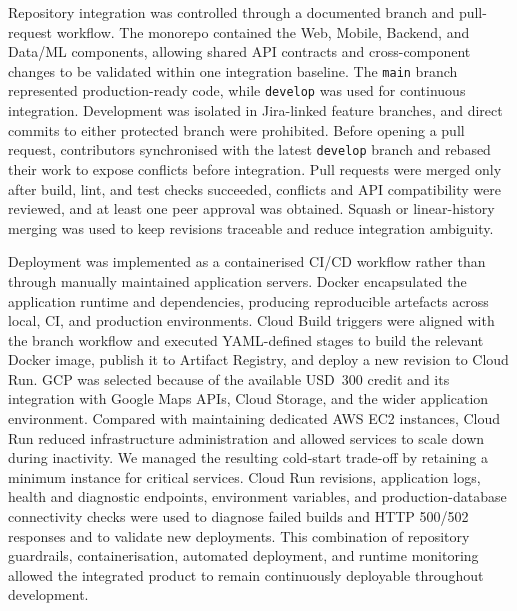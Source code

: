﻿\documentclass[conference,a4paper]{IEEEtran}
\begin{document}
Repository integration was controlled through a documented branch and
pull-request workflow. The monorepo contained the Web, Mobile, Backend, and
Data/ML components, allowing shared API contracts and cross-component
changes to be validated within one integration baseline. The
\texttt{main} branch represented production-ready code, while
\texttt{develop} was used for continuous integration. Development was
isolated in Jira-linked feature branches, and direct commits to either
protected branch were prohibited. Before opening a pull request,
contributors synchronised with the latest \texttt{develop} branch and
rebased their work to expose conflicts before integration. Pull requests
were merged only after build, lint, and test checks succeeded, conflicts
and API compatibility were reviewed, and at least one peer approval was
obtained. Squash or linear-history merging was used to keep revisions
traceable and reduce integration ambiguity.

Deployment was implemented as a containerised CI/CD workflow rather than
through manually maintained application servers. Docker encapsulated the
application runtime and dependencies, producing reproducible artefacts
across local, CI, and production environments. Cloud Build triggers were
aligned with the branch workflow and executed YAML-defined stages to build
the relevant Docker image, publish it to Artifact Registry, and deploy a
new revision to Cloud Run. GCP was selected because of the available
USD~300 credit and its integration with Google Maps APIs, Cloud Storage,
and the wider application environment. Compared with maintaining dedicated
AWS EC2 instances, Cloud Run reduced infrastructure administration and
allowed services to scale down during inactivity. We managed the resulting
cold-start trade-off by retaining a minimum instance for critical services.
Cloud Run revisions, application logs, health and diagnostic endpoints,
environment variables, and production-database connectivity checks were
used to diagnose failed builds and HTTP 500/502 responses and to validate
new deployments. This combination of repository guardrails,
containerisation, automated deployment, and runtime monitoring allowed the
integrated product to remain continuously deployable throughout
development.
\end{document}
